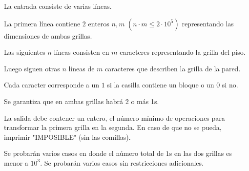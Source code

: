 \documentclass{oci}
\begin{document}
\begin{inputDescription}
La entrada consiste de varias líneas.

La primera línea contiene 2 enteros $n, m$ $(n \cdot m \leq 2 \cdot 10^5)$ representando las dimensiones de ambas grillas.

Las siguientes $n$ líneas consisten en $m$ caracteres representando la grilla del piso.

Luego siguen otras $n$ líneas de $m$ caracteres que describen la grilla de la pared.

Cada caracter corresponde a un $1$ si la casilla contiene un bloque o un $0$ si no.

Se garantiza que en ambas grillas habrá 2 o más 1s.
\end{inputDescription}

\begin{outputDescription}
La salida debe contener un entero, el número mínimo de operaciones para transformar la primera grilla en la segunda. En caso de que no se pueda, imprimir "IMPOSIBLE" (sin las comillas).
\end{outputDescription}

\begin{scoreDescription}
  Se probarán varios casos en donde el número total de $1$s en las dos grillas es menor a $10^3$.
  Se probarán varios casos sin restricciones adicionales.
\end{scoreDescription}

\begin{sampleDescription}
\end{sampleDescription}
\end{document}
